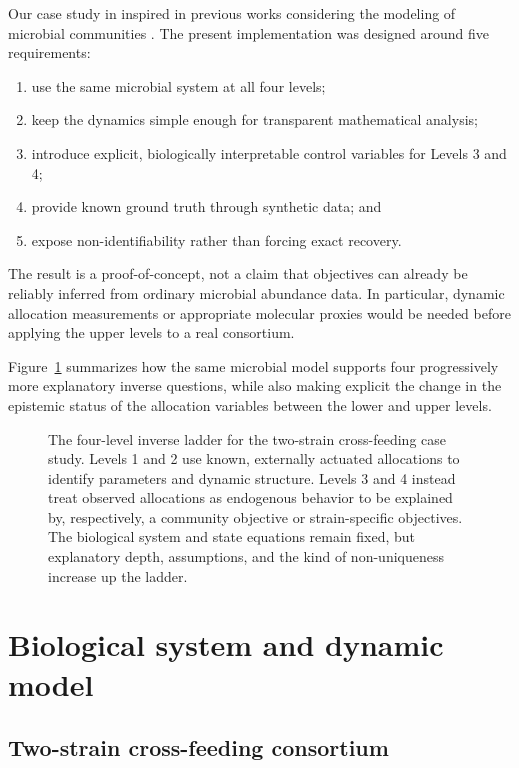 \documentclass[11pt,a4paper]{article}
\begin{document}
Our case study in inspired in previous works considering the modeling of microbial communities \cite{Zomorrodi2012,Mauri2020}. The present implementation was designed around five requirements:
\begin{enumerate}
  \item use the same microbial system at all four levels;
  \item keep the dynamics simple enough for transparent mathematical analysis;
  \item introduce explicit, biologically interpretable control variables for
        Levels 3 and 4;
  \item provide known ground truth through synthetic data; and
  \item expose non-identifiability rather than forcing exact recovery.
\end{enumerate}

The result is a proof-of-concept, not a claim that objectives can already be
reliably inferred from ordinary microbial abundance data. In particular,
dynamic allocation measurements or appropriate molecular proxies would be
needed before applying the upper levels to a real consortium.

Figure~\ref{fig:inverse-ladder-overview} summarizes how the same microbial
model supports four progressively more explanatory inverse questions, while
also making explicit the change in the epistemic status of the allocation
variables between the lower and upper levels.

\begin{figure}[H]
\centering
\resizebox{\textwidth}{!}{%
}
\caption{The four-level inverse ladder for the two-strain cross-feeding case
study. Levels 1 and 2 use known, externally actuated allocations to identify
parameters and dynamic structure. Levels 3 and 4 instead treat observed
allocations as endogenous behavior to be explained by, respectively, a
community objective or strain-specific objectives. The biological system and
state equations remain fixed, but explanatory depth, assumptions, and the
kind of non-uniqueness increase up the ladder.}
\label{fig:inverse-ladder-overview}
\end{figure}

\section{Biological system and dynamic model}

\subsection{Two-strain cross-feeding consortium}
\end{document}
